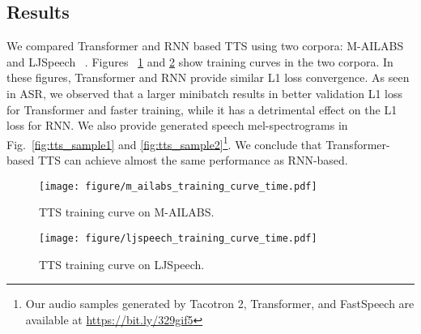 \subsection{Results}
We compared Transformer and RNN based TTS using two corpora: M-AILABS~\cite{mailabs}  and LJSpeech~\cite{ljspeech17} .
Figures ~\ref{fig:training_curve1} and \ref{fig:training_curve2} show training curves in the two corpora.
In these figures, Transformer and RNN provide similar L1 loss convergence.
As seen in ASR, we observed that a larger minibatch results in better validation L1 loss for Transformer and faster training, while it has a detrimental effect on the L1 loss for RNN.
We also provide generated speech mel-spectrograms in Fig.~\ref{fig:tts_sample1} and \ref{fig:tts_sample2}\footnote{Our audio samples generated by Tacotron 2, Transformer, and FastSpeech are available at \url{https://bit.ly/329gif5}}.
We conclude that Transformer-based TTS can achieve almost the same performance as RNN-based.

\begin{figure}[t!]
    \centering
    \texttt{[image: figure/m\_ailabs\_training\_curve\_time.pdf]}
    \vspace{-10mm}
    \caption{TTS training curve on M-AILABS.}
    \vspace{-5mm}
    \label{fig:training_curve1}
\end{figure}
\begin{figure}[t!]
    \centering
    \texttt{[image: figure/ljspeech\_training\_curve\_time.pdf]}
    \vspace{-10mm}
    \caption{TTS training curve on LJSpeech.}
    \vspace{0mm}
    \label{fig:training_curve2}
\end{figure}

